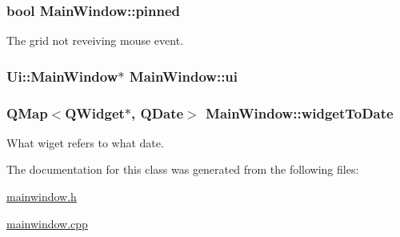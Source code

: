 \subsubsection[{\texorpdfstring{pinned}{pinned}}]{\setlength{\rightskip}{0pt plus 5cm}bool Main\+Window\+::pinned\hspace{0.3cm}{\ttfamily [private]}}\hypertarget{classMainWindow_aac8447a932ef41f544891a8d74d04ab9}{}\label{classMainWindow_aac8447a932ef41f544891a8d74d04ab9}


The grid not reveiving mouse event. 

\subsubsection[{\texorpdfstring{ui}{ui}}]{\setlength{\rightskip}{0pt plus 5cm}Ui\+::\+Main\+Window$\ast$ Main\+Window\+::ui\hspace{0.3cm}{\ttfamily [private]}}\hypertarget{classMainWindow_a35466a70ed47252a0191168126a352a5}{}\label{classMainWindow_a35466a70ed47252a0191168126a352a5}
\subsubsection[{\texorpdfstring{widget\+To\+Date}{widgetToDate}}]{\setlength{\rightskip}{0pt plus 5cm}Q\+Map$<$Q\+Widget$\ast$, Q\+Date$>$ Main\+Window\+::widget\+To\+Date\hspace{0.3cm}{\ttfamily [private]}}\hypertarget{classMainWindow_ae81ee3cac7678dba0be2fcc37949daa7}{}\label{classMainWindow_ae81ee3cac7678dba0be2fcc37949daa7}


What wiget refers to what date. 



The documentation for this class was generated from the following files\+:\begin{DoxyCompactItemize}
\item 
\hyperlink{mainwindow_8h}{mainwindow.\+h}\item 
\hyperlink{mainwindow_8cpp}{mainwindow.\+cpp}\end{DoxyCompactItemize}
